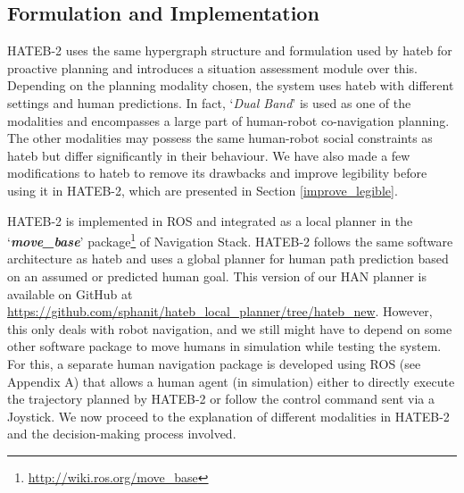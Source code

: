 
\subsection{Formulation and Implementation}
HATEB-2 uses the same hypergraph structure and formulation used by \acrshort{hateb} for proactive planning and introduces a situation assessment module over this. Depending on the planning modality chosen, the system uses \acrshort{hateb} with different settings and human predictions. In fact, `\textit{Dual Band}' is used as one of the modalities and encompasses a large part of human-robot co-navigation planning. The other modalities may possess the same human-robot social constraints as \acrshort{hateb} but differ significantly in their behaviour. We have also made a few modifications to \acrshort{hateb} to remove its drawbacks and improve legibility before using it in HATEB-2, which are presented in Section \ref{improve_legible}.

HATEB-2 is implemented in ROS and integrated as a local planner in the `\textbf{\textit{move\_base}}' package\footnote{\url{http://wiki.ros.org/move_base}} of Navigation Stack. HATEB-2 follows the same software architecture as \acrshort{hateb} and uses a global planner for human path prediction based on an assumed or predicted human goal. This version of our HAN planner is available on GitHub at {\small{\url{https://github.com/sphanit/hateb_local_planner/tree/hateb_new}}}. However, this only deals with robot navigation, and we still might have to depend on some other software package to move humans in simulation while testing the system. For this, a separate human navigation package is developed using ROS (see Appendix A) that allows a human agent (in simulation) either to directly execute the trajectory planned by HATEB-2 or follow the control command sent via a Joystick. We now proceed to the explanation of different modalities in HATEB-2 and the decision-making process involved. 

